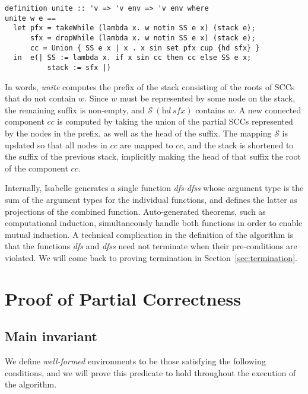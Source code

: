 \documentclass[sigplan,10pt,anonymous,review]{acmart}
\newcommand{\prog}[1]{\textit{#1}}
\renewcommand{\SS}{\mathcal{S}}
\begin{document}
\begin{small}
\begin{lstlisting}[language=isabelle]
definition unite :: 'v => 'v env => 'v env where
unite w e ==
  let pfx = takeWhile (lambda x. w notin SS e x) (stack e);
      sfx = dropWhile (lambda x. w notin SS e x) (stack e);
      cc = Union { SS e x | x . x sin set pfx cup {hd sfx} }
  in  e(| SS := lambda x. if x sin cc then cc else SS e x;
          stack := sfx |)
\end{lstlisting}
\end{small}

In words, \prog{unite} computes the prefix of the stack consisting of the roots of SCCs that do not contain $w$. Since $w$ must be represented by some node on the stack, the remaining suffix is non-empty, and $\SS~(\prog{hd}~\prog{sfx})$ contains $w$. A new connected component $\prog{cc}$ is computed by taking the union of the partial SCCs represented by the nodes in the prefix, as well as the head of the suffix. The mapping $\SS$ is updated so that all nodes in $\prog{cc}$ are mapped to $\prog{cc}$, and the stack is shortened to the suffix of the previous stack, implicitly making the head of that suffix the root of the component $cc$.

Internally, Isabelle generates a single function \prog{dfs-dfss} whose argument type is the sum of the argument types for the individual functions, and defines the latter as projections of the combined function. Auto-generated theorems, such as computational induction, simultaneously handle both functions in order to enable mutual induction. A technical complication in the definition of the algorithm is that the functions \prog{dfs} and \prog{dfss} need not terminate when their pre-conditions are violated. We will come back to proving termination in Section~\ref{sec:termination}.


\section{Proof of Partial Correctness}
\label{sec:partial-correctness}

\subsection{Main invariant}
\label{sec:invariant}

We define \emph{well-formed} environments to be those satisfying the following conditions, and we will prove this predicate to hold throughout the execution of the algorithm.
\end{document}
